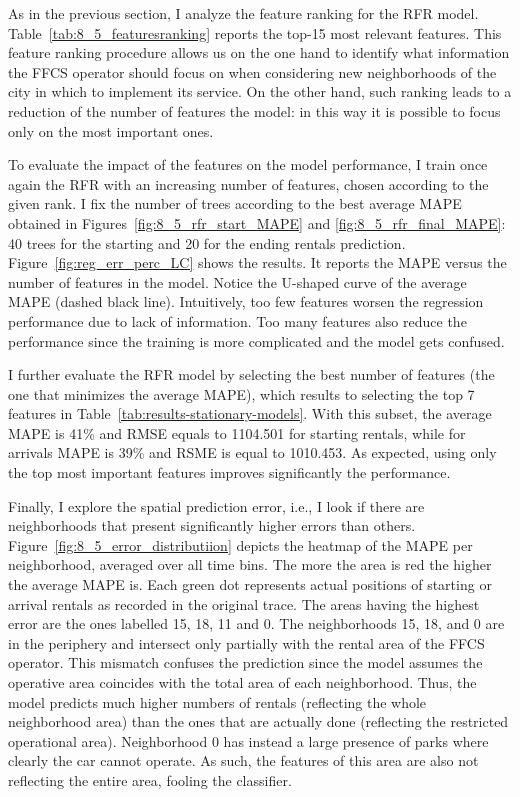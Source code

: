 As in the previous section, I analyze the feature ranking for the RFR model. 
Table~\ref{tab:8_5_featuresranking} reports the top-15 most relevant features. 
This feature ranking procedure allows us on the one hand to identify what information the FFCS operator should focus on when considering new neighborhoods of the city in which to implement its service. 
On the other hand, such ranking leads to a reduction of the number of features the model: in this way it is possible to focus only on the most important ones.

To evaluate the impact of the features on the model performance, I train once again the RFR with an increasing number of features, chosen according to the given rank. I fix the number of trees according to the best average MAPE obtained in Figures~\ref{fig:8_5_rfr_start_MAPE} and \ref{fig:8_5_rfr_final_MAPE}: 40 trees for the starting and 20 for the ending rentals prediction. Figure~\ref{fig:reg_err_perc_LC} shows the results. It reports the MAPE versus the number of features in the model.
Notice the U-shaped curve of the average MAPE (dashed black line). Intuitively, too few features worsen the regression performance due to lack of information. Too many features also reduce the performance since the training is more complicated and the model gets confused.

I further evaluate the RFR model by selecting the best number of features (the one that minimizes the average MAPE), which results to selecting the top 7 features in Table~\ref{tab:results-stationary-models}. With this subset, the average MAPE is 41\% and RMSE equals to 1104.501 for starting rentals, while for arrivals
MAPE is 39\% and  RSME is equal to 1010.453.%
As expected, using only the top most important features improves significantly the performance.

Finally, I explore the spatial prediction error, i.e., I look if there are neighborhoods that present significantly higher errors than others.
Figure~\ref{fig:8_5_error_distributiion} depicts the heatmap of the MAPE per neighborhood, averaged over all time bins. The more the area is red the higher the average MAPE is. Each green dot represents actual positions of starting or arrival rentals as recorded in the original trace.
The areas having the highest error are the ones labelled 15, 18, 11 and 0. The neighborhoods 15, 18, and 0 are in the periphery and intersect only partially with the rental area of the FFCS operator. This mismatch confuses the prediction since the model assumes the operative area coincides with the total area of each neighborhood. Thus, the model predicts much higher numbers of rentals (reflecting the whole neighborhood area) than the ones that are actually done (reflecting the restricted operational area). Neighborhood 0 has instead a large presence of parks where clearly the car cannot operate. As such, the features of this area are also not reflecting the entire area, fooling the classifier.

